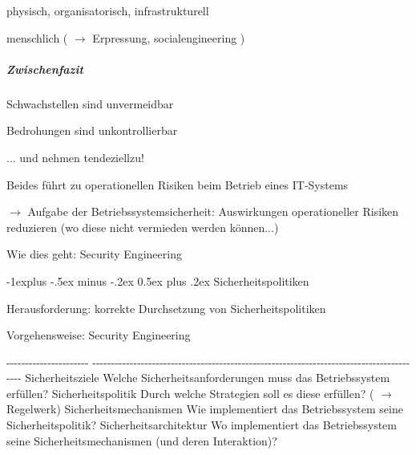 \documentclass[a4paper]{article}
\makeatletter
\renewcommand{\subsection}{\@startsection{subsection}{2}{0mm}%
 {-1explus -.5ex minus -.2ex}%
 {0.5ex plus .2ex}%
 {\normalfont\normalsize\bfseries}}
\makeatother
\begin{document}
\begin{multicols}{3}
    \begin{itemize*}
        \item
        physisch, organisatorisch, infrastrukturell
        \item
        menschlich ( $\rightarrow$ Erpressung,
        socialengineering )
    \end{itemize*}


    \subparagraph{Zwischenfazit}

    \begin{itemize*}
        \item
        Schwachstellen sind unvermeidbar
        \item
        Bedrohungen sind unkontrollierbar
        \begin{itemize*}
            \item ... und nehmen tendeziellzu!
        \end{itemize*}
    \end{itemize*}

    Beides führt zu operationellen Risiken beim Betrieb eines IT-Systems

    $\rightarrow$ Aufgabe der Betriebssystemsicherheit:
    Auswirkungen operationeller Risiken reduzieren (wo diese nicht vermieden
    werden können...)

    Wie dies geht: Security Engineering


    \subsection{Sicherheitspolitiken}

    \begin{itemize*}
        \item
        Herausforderung: korrekte Durchsetzung von Sicherheitspolitiken
        \item
        Vorgehensweise: Security Engineering
    \end{itemize*}

    \textbar{} \textbar{} \textbar{}
    -\/-\/-\/-\/-\/-\/-\/-\/-\/-\/-\/-\/-\/-\/-\/-\/-\/-\/-\/-\/-\/-
    \textbar{}
    -\/-\/-\/-\/-\/-\/-\/-\/-\/-\/-\/-\/-\/-\/-\/-\/-\/-\/-\/-\/-\/-\/-\/-\/-\/-\/-\/-\/-\/-\/-\/-\/-\/-\/-\/-\/-\/-\/-\/-\/-\/-\/-\/-\/-\/-\/-\/-\/-\/-\/-\/-\/-\/-\/-\/-\/-\/-\/-\/-\/-\/-\/-\/-\/-\/-\/-\/-\/-\/-\/-\/-\/-\/-\/-\/-\/-\/-\/-\/-\/-\/-\/-\/-\/-\/-\/-\/-\/-
    \textbar{} \textbar{} Sicherheitsziele \textbar{} Welche
    Sicherheitsanforderungen muss das Betriebssystem erfüllen? \textbar{}
    \textbar{} Sicherheitspolitik \textbar{} Durch welche Strategien soll es
    diese erfüllen? ( $\rightarrow$ Regelwerk) \textbar{}
    \textbar{} Sicherheitsmechanismen \textbar{} Wie implementiert das
    Betriebssystem seine Sicherheitspolitik? \textbar{} \textbar{}
    Sicherheitsarchitektur \textbar{} Wo implementiert das Betriebssystem
    seine Sicherheitsmechanismen (und deren Interaktion)? \textbar{}



\end{multicols}
\end{document}
